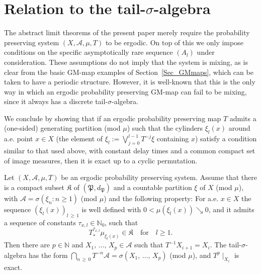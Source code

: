 \documentclass[10pt]{amsart}
\theoremstyle{definition}\newtheorem{defi}[theo]{Definition}\newtheorem{rema}[theo]{Remark}\newtheorem{exam}[theo]{Example}\newtheorem{exem}[theo]{Example}\newtheorem{nota}[theo]{Notation}
\newcommand{\clA}{\mathcal{A}}
\newcommand{\frkK}{\mathfrak{K}}
\newcommand{\frkP}{\mathfrak{P}}
\newcommand{\bbN}{\mathbb{N}}
\begin{document}
\section{Relation to the tail-\texorpdfstring{$\sigma$}{sigma}-algebra}

The abstract limit theorems of the present paper merely require the probability preserving system $(X,\clA,\mu,T)$ to be ergodic. On top of this we only impose conditions on the specific asymptotically rare sequence $(A_{l})$ under consideration. These assumptions do not imply that the system is mixing, as is clear from the basic GM-map examples of Section~\ref{Sec_GMmaps}, which can be taken to have a periodic structure. However, it is well-known that this is the only way in which an ergodic probability preserving GM-map can fail to be mixing, since it always has a discrete tail-$\sigma$-algebra.

We conclude by showing that if an ergodic probability preserving map $T$ admits a (one-sided) generating partition (mod $\mu$) such that the cylinders $\xi_{l}(x)$ around a.e. point $x\in X$ (the element of $\xi_{l} :=\bigvee_{j=0}^{l-1}T^{-j}\xi$ containing $x$) satisfy a condition similar to that used above, with constant delay times and a common compact set of image measures, then it is exact up to a cyclic permutation.

\begin{prop}
Let $(X,\clA,\mu,T)$ be an ergodic probability preserving system. Assume that there is a compact subset $\frkK$ of $(\frkP,d_{\frkP})$ and a countable partition $\xi$ of $X$ (mod $\mu$), with $\clA=\sigma(\xi_{n}:n\geq1)$ (mod $\mu$) and the following property: For a.e. $x\in X$ the sequence $(\xi_{l}(x))_{l\,\geq\,1}$ is well defined with $0<\mu(\xi_{l}(x))\searrow0$, and it admits a sequence of constants $\tau_{x,l}\in\bbN_{0}$, such that
\begin{equation}\label{Eq_jshdcsjadhvbh}
T_{\ast}^{\tau_{x,l}}\mu_{\xi_{l}(x)}\in\frkK \quad \text{for} \quad  l\geq1. 
\end{equation}
Then there are $p\in\bbN$ and $X_{1},\,\ldots,\,X_{p}\in\clA$ such that $T^{-1}X_{i+1}=X_{i}$. The tail-$\sigma$-algebra has the form $\bigcap_{n\,\geq\,0}T^{-n}\clA=\sigma(X_{1},\,\ldots,\,X_{p})$ (mod $\mu$), and $T^{p}\mid_{X_{i}}$ is exact.
\end{prop}
\end{document}
